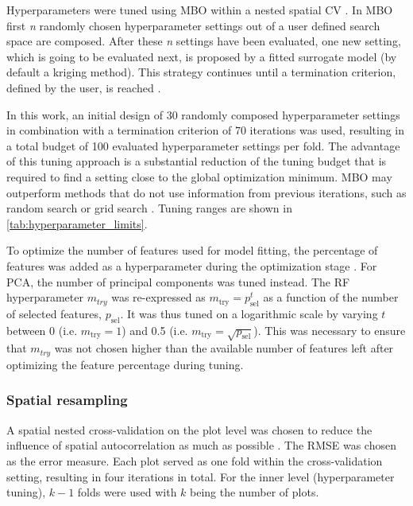 \documentclass[journal]{IEEEtran}
\begin{document}
Hyperparameters were tuned using \ac{MBO} within a nested spatial \ac{CV} \cite{mlrmbo, binder2020, schratz2019}.
In MBO first \textit{n} randomly chosen hyperparameter settings out of a user defined search space are composed.
After these \textit{n} settings have been evaluated, one new setting, which is going to be evaluated next, is proposed by a fitted surrogate model (by default a kriging method).
This strategy continues until a termination criterion, defined by the user, is reached \cite{hutter2011, jones1998}.

In this work, an initial design of 30 randomly composed hyperparameter settings in combination with a termination criterion of 70 iterations was used, resulting in a total budget of 100 evaluated hyperparameter settings per fold.
The advantage of this tuning approach is a substantial reduction of the tuning budget that is required to find a setting close to the global optimization minimum.
\ac{MBO} may outperform methods that do not use information from previous iterations, such as random search or grid search \cite{bergstra2012}.
Tuning ranges are shown in \autoref{tab:hyperparameter_limits}.

To optimize the number of features used for model fitting, the percentage of features was added as a hyperparameter during the optimization stage \cite{binder2020}.
For \ac{PCA}, the number of principal components was tuned instead.
The RF hyperparameter \texttt{\(m_{try}\)} was re-expressed as $m_\textrm{try} = p_\textrm{sel}^t$ as a function of the number of selected features, $p_\textrm{sel}$.
It was thus tuned on a logarithmic scale by varying $t$ between 0 (i.e. $m_\textrm{try} = 1$) and 0.5 (i.e. $m_\textrm{try}=\sqrt{p_\textrm{sel}}$).
This was necessary to ensure that \texttt{\(m_{try}\)} was not chosen higher than the available number of features left after optimizing the feature percentage during tuning.

\subsubsection{Spatial resampling}

A spatial nested cross-validation on the plot level was chosen to reduce the influence of spatial autocorrelation as much as possible \cite{schratz2019, sperrorest}.
The \ac{RMSE} was chosen as the error measure.
Each plot served as one fold within the cross-validation setting, resulting in four iterations in total.
For the inner level (hyperparameter tuning), \(k - 1\) folds were used with \(k\) being the number of plots.
\end{document}
